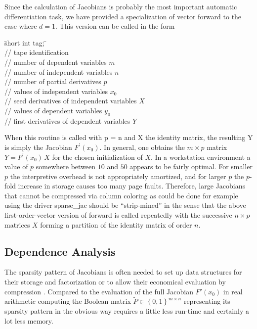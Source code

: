 \documentclass[11pt,twoside]{article}
\begin{document}
Since the calculation of Jacobians is probably the most important
automatic differentia\-tion task, we have provided a specialization
of vector {\sf forward} to the case where $d = 1$. This version can be 
called in the form
%
\begin{tabbing}
\hspace{0.5in}\={\sf short int tag;} \hspace{1.1in}\= \kill    %
\\
         \> // tape identification \\
                 \> // number of dependent variables $m$\\
                 \> // number of independent variables $n$\\
                 \> // number of partial derivatives $p$ \\
          \> // values of independent variables $x_0$\\
        \> // seed derivatives of independent variables $X$\\
           \> // values of dependent variables $y_0$\\
        \> // first derivatives of dependent variables $Y$
\end{tabbing}
%
When this routine is called with {\sf p} = {\sf n} and {\sf X} the identity matrix,
the resulting {\sf Y} is simply the Jacobian $F^\prime(x_0)$. In general,
one obtains the $m\times p$ matrix $Y=F^\prime(x_0)\,X $ for the
chosen initialization of $X$. In a workstation environment a value
of $p$ somewhere between $10$ and $50$
appears to be fairly optimal. For smaller $p$ the interpretive
overhead is not appropriately amortized, and for larger $p$ the
$p$-fold increase in storage causes too many page faults. Therefore,
large Jacobians that cannot be compressed via column coloring
as could be done for example using the driver {\sf sparse\_jac}
should be ``strip-mined'' in the sense that the above
first-order-vector version of {\sf forward} is called 
repeatedly with the successive \mbox{$n \times p$} matrices $X$ forming
a partition of the identity matrix of order $n$.
%
\subsection{Dependence Analysis}
%
\label{ProBit}
% 
The sparsity pattern of Jacobians is often needed to set up data structures
for their storage and factorization or to allow their economical evaluation 
by compression \cite{BeKh96}. Compared to the evaluation of the full
Jacobian $F'(x_0)$ in real arithmetic computing the Boolean matrix 
$\tilde{P}\in\left\{0,1\right\}^{m\times n}$ representing its sparsity
pattern in the obvious way requires a little less run-time and
certainly a lot less memory. 
\end{document}
